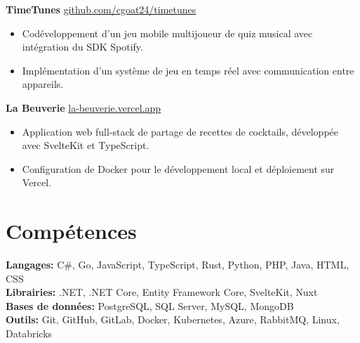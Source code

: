 \documentclass[10pt]{article}       %
\begin{document}
\textbf{TimeTunes} \hfill \href{https://github.com/cgoat24/timetunes}{github.com/cgoat24/timetunes} \\
\vspace{-9pt}
\begin{itemize}
  \item Codéveloppement d'un jeu mobile multijoueur de quiz musical avec intégration du SDK Spotify.
  \item Implémentation d'un système de jeu en temps réel avec communication entre appareils.
\end{itemize}

\textbf{La Beuverie} \hfill \href{https://la-beuverie.vercel.app}{la-beuverie.vercel.app} \\
\vspace{-9pt}
\begin{itemize}
  \item Application web full-stack de partage de recettes de cocktails, développée avec SvelteKit et TypeScript.
  \item Configuration de Docker pour le développement local et déploiement sur Vercel.
\end{itemize}

\vspace{-18.5pt}

\section*{Compétences}
\textbf{Langages:} C\#, Go, JavaScript, TypeScript, Rust, Python, PHP, Java, HTML, CSS \\
\textbf{Librairies:} .NET, .NET Core, Entity Framework Core, SvelteKit, Nuxt\\
\textbf{Bases de données:} PostgreSQL, SQL Server, MySQL, MongoDB \\
\textbf{Outils:} Git, GitHub, GitLab, Docker, Kubernetes, Azure,  RabbitMQ, Linux, Databricks
\end{document}
